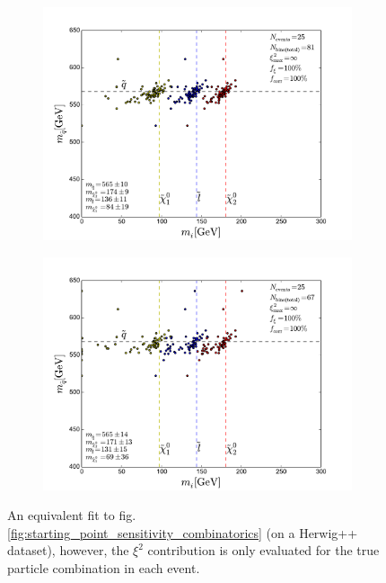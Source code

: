 \documentclass[twoside,english]{uiofysmaster}
\begin{document}
\begin{figure}[hbt]
	\begin{subfigure}[b]{0.45\textwidth}
		\includegraphics[width=\textwidth]{figures/improving_combinatorics/herwigpp-momcons_nocomb_800-500-300-50.pdf} 
		\caption{ }
  \label{fig:starting_point_sensitivity_no_combinatorics_c}
	\end{subfigure}
	\begin{subfigure}[b]{0.45\textwidth}
		\includegraphics[width=\textwidth]{figures/improving_combinatorics/herwigpp-momcons_nocomb_1000-100-80-30.pdf}
		\caption{ } 
  \label{fig:starting_point_sensitivity_no_combinatorics_d}
	\end{subfigure}
	\caption{An equivalent fit to fig. \ref{fig:starting_point_sensitivity_combinatorics} (on a {\ttfamily Herwig++} dataset), however, the $\xi^2$ contribution is only evaluated for the true particle combination in each event.}
	\label{fig:starting_point_sensitivity_no_combinatorics}
\end{figure}
\end{document}
